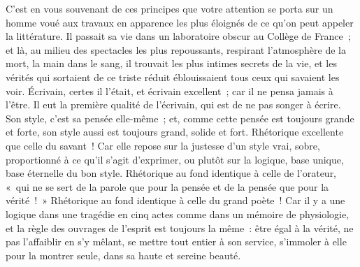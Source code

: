 \documentclass[french,twoside]{book} %
\newcommand\orgName[1]{#1}
\begin{document}
C’est en vous souvenant de ces principes que votre attention se porta sur un homme voué aux travaux en apparence les plus éloignés de ce qu’on peut appeler la littérature. Il passait sa vie dans un laboratoire obscur au {\orgName Collège de France} ; et là, au milieu des spectacles les plus repoussants, respirant l’atmosphère de la mort, la main dans le sang, il trouvait les plus intimes secrets de la vie, et les vérités qui sortaient de ce triste réduit éblouissaient tous ceux qui savaient les voir. Écrivain, certes il l’était, et écrivain excellent ; car il ne pensa jamais à l’être. Il eut la première qualité de l’écrivain, qui est de ne pas songer à écrire. Son style, c’est sa pensée elle-même ; et, comme cette pensée est toujours grande et forte, son style aussi est toujours grand, solide et fort. Rhétorique excellente que celle du savant ! Car elle repose sur la justesse d’un style vrai, sobre, proportionné à ce qu’il s’agit d’exprimer, ou plutôt sur la logique, base unique, base éternelle du bon style. Rhétorique au fond identique à celle de l’orateur, « qui ne se sert de la parole que pour la pensée et de la pensée que pour la vérité ! » Rhétorique au fond identique à celle du grand poète ! Car il y a une logique dans une tragédie en cinq actes comme dans un mémoire de physiologie, et la règle des ouvrages de l’esprit est toujours la même : être égal à la vérité, ne pas l’affaiblir en s’y mêlant, se mettre tout entier à son service, s’immoler à elle pour la montrer seule, dans sa haute et sereine beauté.\par
\end{document}
